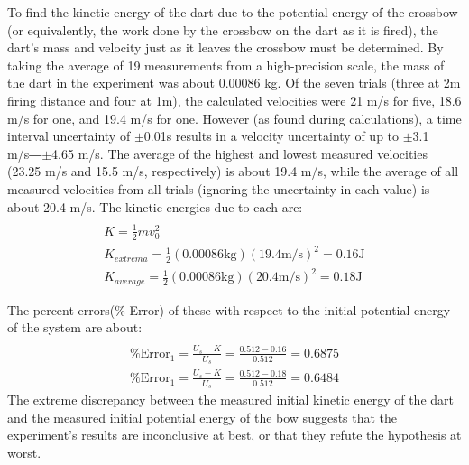 \documentclass[twocolumn, 10pt]{article}
\begin{document}
To find the kinetic energy of the dart due to the potential energy of the crossbow (or equivalently, the work done by the crossbow on the dart as it is fired), the dart’s mass and velocity just as it leaves the crossbow must be determined. By taking the average of 19 measurements from a high-precision scale, the mass of the dart in the experiment was about 0.00086 kg. Of the seven trials (three at 2m firing distance and four at 1m), the calculated velocities were 21 m/s for five, 18.6 m/s for one, and 19.4 m/s for one. However (as found during calculations), a time interval uncertainty of $\pm$0.01s results in a velocity uncertainty of up to $\pm$3.1 m/s―$\pm$4.65 m/s. The average of the highest and lowest measured velocities (23.25 m/s and 15.5 m/s, respectively) is about 19.4 m/s, while the average of all measured velocities from all trials (ignoring the uncertainty in each value) is about 20.4 m/s. The kinetic energies due to each are:
\vspace{-10pt}
\begin{gather*}
	\\K = \frac{1}{2}mv_0^2
	\\ K_{extrema} = \frac{1}{2}(0.00086\text{kg})(19.4\text{m/s})^2=0.16\text{J}
	\\ K_{average} = \frac{1}{2}(0.00086\text{kg})(20.4\text{m/s})^2=0.18 \text{J}
\end{gather*}

The percent errors(\% Error) of these with respect to the initial potential energy of the system are about:
\vspace{-5pt}
\begin{gather*}
	\\ \text{\% Error}_1 = \frac{U_s-K}{U_s} = \frac{0.512-0.16}{0.512} = 0.6875
	\\ \text{\% Error}_1 = \frac{U_s-K}{U_s} = \frac{0.512-0.18}{0.512} = 0.6484
\end{gather*}
The extreme discrepancy between the measured initial kinetic energy of the dart and the measured initial potential energy of the bow suggests that the experiment’s results are inconclusive at best, or that they refute the hypothesis at worst.
\end{document}
